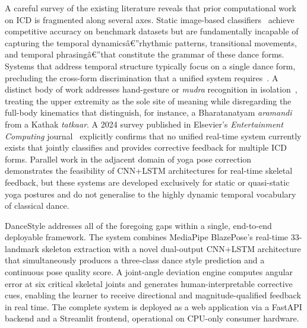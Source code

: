 \documentclass[journal]{IEEEtran}
\begin{document}
A careful survey of the existing literature reveals that prior
computational work on ICD is fragmented along several axes. Static
image-based classifiers~\cite{jain2021} achieve competitive accuracy on
benchmark datasets but are fundamentally incapable of capturing the
temporal dynamicsâ€”rhythmic patterns, transitional movements, and
temporal phrasingâ€”that constitute the grammar of these dance forms.
Systems that address temporal structure typically focus on a single
dance form, precluding the cross-form discrimination that a unified
system requires~\cite{naik2021}. A distinct body of work addresses
hand-gesture or \textit{mudra} recognition in isolation~\cite{challapalli2022},
treating the upper extremity as the sole site of meaning while
disregarding the full-body kinematics that distinguish, for instance, a
Bharatanatyam \textit{aramandi} from a Kathak \textit{tatkaar}. A 2024
survey published in Elsevier's \textit{Entertainment Computing}
journal~\cite{survey2024} explicitly confirms that no unified real-time
system currently exists that jointly classifies and provides corrective
feedback for multiple ICD forms. Parallel work in the adjacent domain
of yoga pose correction~\cite{thoutam2022,swain2022} demonstrates the
feasibility of CNN+LSTM architectures for real-time skeletal feedback,
but these systems are developed exclusively for static or quasi-static
yoga postures and do not generalise to the highly dynamic temporal
vocabulary of classical dance.

DanceStyle addresses all of the foregoing gaps within a single, end-to-end
deployable framework. The system combines MediaPipe BlazePose's
real-time 33-landmark skeleton extraction with a novel dual-output
CNN+LSTM architecture that simultaneously produces a three-class
dance style prediction and a continuous pose quality score. A
joint-angle deviation engine computes angular error at six critical
skeletal joints and generates human-interpretable corrective cues,
enabling the learner to receive directional and magnitude-qualified
feedback in real time. The complete system is deployed as a web
application via a FastAPI backend and a Streamlit frontend, operational
on CPU-only consumer hardware.
\end{document}
